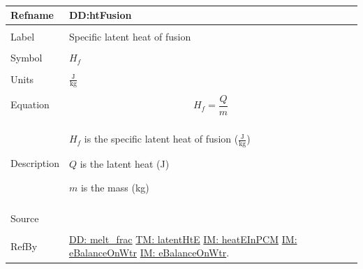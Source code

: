 \documentclass[12pt]{article}
\begin{document}
~\newline
\noindent \begin{minipage}{\textwidth}
\begin{tabular}{p{} p{}}
\toprule \textbf{Refname} & \textbf{DD:htFusion}
\label{DD:htFusion}
\\ \midrule \\
Label & Specific latent heat of fusion
\\ \midrule \\
Symbol & ${H_{f}}$
\\ \midrule \\
Units & $\frac{\text{J}}{\text{kg}}$
\\ \midrule \\
Equation & \begin{dmath}
           {H_{f}}=\frac{Q}{m}
           \end{dmath}
\\ \midrule \\
Description & \begin{symbDescription}
              \item{${H_{f}}$ is the specific latent heat of fusion ($\frac{\text{J}}{\text{kg}}$)}
              \item{$Q$ is the latent heat (J)}
              \item{$m$ is the mass (kg)}
              \end{symbDescription}
\\ \midrule \\
Source & \cite{bueche1986}
\\ \midrule \\
RefBy & \hyperref[DD:melt.frac]{DD: melt\_frac} \hyperref[T:latentHtE]{TM: latentHtE} \hyperref[IM:heatEInPCM]{IM: heatEInPCM} \hyperref[IM:eBalanceOnWtr]{IM: eBalanceOnWtr} \hyperref[IM:eBalanceOnWtr]{IM: eBalanceOnWtr}.
\\ \bottomrule \end{tabular}
\end{minipage}\\
~\newline
\end{document}
